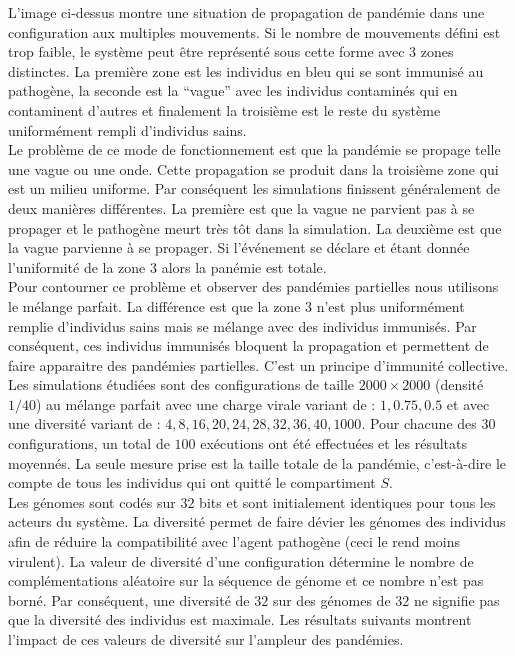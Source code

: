 L’image ci-dessus montre une situation de propagation de pandémie dans une configuration aux multiples mouvements. Si le nombre de mouvements défini est trop faible, le système peut être représenté sous cette forme avec $3$ zones distinctes. La première zone est les individus en bleu qui se sont immunisé au pathogène, la seconde est la “vague” avec les individus contaminés qui en contaminent d’autres et finalement la troisième est le reste du système uniformément rempli d’individus sains.\\ 

Le problème de ce mode de fonctionnement est que la pandémie se propage telle une vague ou une onde. Cette propagation se produit dans la troisième zone qui est un milieu uniforme. Par conséquent les simulations finissent généralement de deux manières différentes. La première est que la vague ne parvient pas à se propager et le pathogène meurt très tôt dans la simulation. La deuxième est que la vague parvienne à se propager. Si l'événement se déclare et étant donnée l'uniformité de la zone $3$ alors la panémie est totale.\\ 

Pour contourner ce problème et observer des pandémies partielles nous utilisons le mélange parfait. La différence est que la zone $3$ n’est plus uniformément remplie d’individus sains mais se mélange avec des individus immunisés. Par conséquent, ces individus immunisés bloquent la propagation et permettent de faire apparaitre des pandémies partielles. C’est un principe d’immunité collective.\\ 

Les simulations étudiées sont des configurations de taille $2000 \times 2000$ (densité $1/40$) au mélange parfait avec une charge virale variant de : $1, 0.75, 0.5$ et avec une diversité variant de : $4,8,16,20,24,28,32,36,40,1000$. Pour chacune des $30$ configurations, un total de $100$ exécutions ont été effectuées et les résultats moyennés. La seule mesure prise est la taille totale de la pandémie, c'est-à-dire le compte de tous les individus qui ont quitté le compartiment $S$.\\

Les génomes sont codés sur $32$ bits et sont initialement identiques pour tous les acteurs du système. La diversité permet de faire dévier les génomes des individus afin de réduire la compatibilité avec l'agent pathogène (ceci le rend moins virulent). La valeur de diversité d'une configuration détermine le nombre de complémentations aléatoire sur la séquence de génome et ce nombre n'est pas borné. Par conséquent, une diversité de $32$ sur des génomes de $32$ ne signifie pas que la diversité des individus est maximale. Les résultats suivants montrent l'impact de ces valeurs de diversité sur l'ampleur des pandémies.

